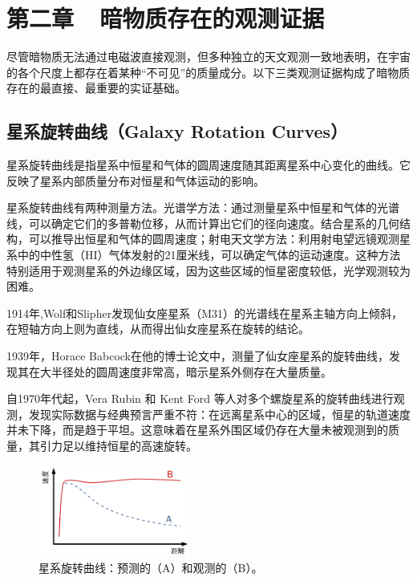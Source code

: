 \section*{第二章~~暗物质存在的观测证据}
\setcounter{section}{2} \setcounter{subsection}{0}
\setcounter{table}{0} \setcounter{figure}{0} \setcounter{equation}{0}

尽管暗物质无法通过电磁波直接观测，但多种独立的天文观测一致地表明，在宇宙的各个尺度上都存在着某种“不可见”的质量成分。以下三类观测证据构成了暗物质存在的最直接、最重要的实证基础。

\subsection{星系旋转曲线（Galaxy Rotation Curves）}

星系旋转曲线是指星系中恒星和气体的圆周速度随其距离星系中心变化的曲线。它反映了星系内部质量分布对恒星和气体运动的影响。

星系旋转曲线有两种测量方法。光谱学方法：通过测量星系中恒星和气体的光谱线，可以确定它们的多普勒位移，从而计算出它们的径向速度。结合星系的几何结构，可以推导出恒星和气体的圆周速度；射电天文学方法：利用射电望远镜观测星系中的中性氢（HI）气体发射的21厘米线，可以确定气体的运动速度。这种方法特别适用于观测星系的外边缘区域，因为这些区域的恒星密度较低，光学观测较为困难。

1914年,Wolf和Slipher发现仙女座星系（M31）的光谱线在星系主轴方向上倾斜，在短轴方向上则为直线，从而得出仙女座星系在旋转的结论。

1939年，Horace Babcock在他的博士论文中，测量了仙女座星系的旋转曲线，发现其在大半径处的圆周速度非常高，暗示星系外侧存在大量质量。

自1970年代起，Vera Rubin 和 Kent Ford 等人对多个螺旋星系的旋转曲线进行观测，发现实际数据与经典预言严重不符：在远离星系中心的区域，恒星的轨道速度并未下降，而是趋于平坦。这意味着在星系外围区域仍存在大量未被观测到的质量，其引力足以维持恒星的高速旋转。

\begin{figure}[!htbp]
    \centering    
    \includegraphics[height=3cm]{Img/2-1.png}
    \caption{星系旋转曲线：预测的（A）和观测的（B）。 }
    \label{2-1}
\end{figure}

